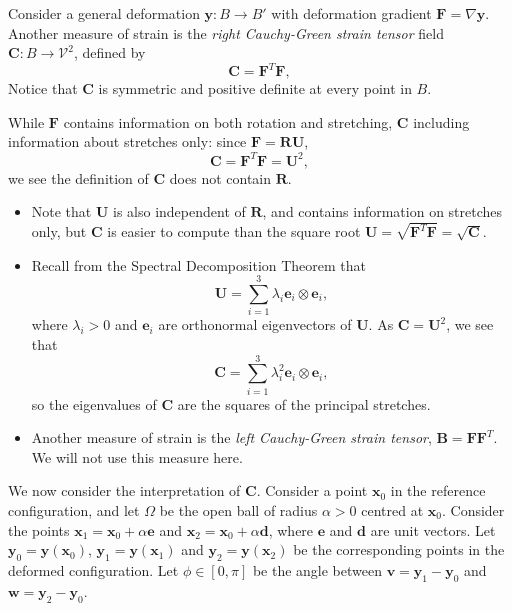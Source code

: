 \documentclass[
  letterpaper,
  DIV=11,
  numbers=noendperiod]{scrreprt}
\theoremstyle{plain}
\theoremstyle{remark}
\begin{document}
Consider a general deformation \({\boldsymbol{y}}:B\to B'\) with
deformation gradient \({\boldsymbol{F}}= \nabla {\boldsymbol{y}}\).
Another measure of strain is the \emph{right Cauchy-Green strain tensor}
field \({\boldsymbol{C}}:B\to{\mathcal{V}}^2\), defined by
\[{\boldsymbol{C}}= {\boldsymbol{F}}^T{\boldsymbol{F}},\] Notice that
\({\boldsymbol{C}}\) is symmetric and positive definite at every point
in \(B\).

While \({\boldsymbol{F}}\) contains information on both rotation and
stretching, \({\boldsymbol{C}}\) including information about stretches
only: since \({\boldsymbol{F}}={\boldsymbol{R}}{\boldsymbol{U}}\),
\[{\boldsymbol{C}}= {\boldsymbol{F}}^T{\boldsymbol{F}}= {\boldsymbol{U}}^2,\]
we see the definition of \({\boldsymbol{C}}\) does not contain
\({\boldsymbol{R}}\).

\begin{itemize}
\item
  Note that \({\boldsymbol{U}}\) is also independent of
  \({\boldsymbol{R}}\), and contains information on stretches only, but
  \({\boldsymbol{C}}\) is easier to compute than the square root
  \({\boldsymbol{U}}=\sqrt{{\boldsymbol{F}}^T{\boldsymbol{F}}}=\sqrt{{\boldsymbol{C}}}\).
\item
  Recall from the Spectral Decomposition Theorem that
  \[{\boldsymbol{U}}= \sum_{i=1}^3 \lambda_i{\boldsymbol{e}}_i\otimes{\boldsymbol{e}}_i,\]
  where \(\lambda_i>0\) and \({\boldsymbol{e}}_i\) are orthonormal
  eigenvectors of \({\boldsymbol{U}}\). As
  \({\boldsymbol{C}}= {\boldsymbol{U}}^2\), we see that
  \[{\boldsymbol{C}}= \sum_{i=1}^3 \lambda_i^2{\boldsymbol{e}}_i\otimes{\boldsymbol{e}}_i,\]
  so the eigenvalues of \({\boldsymbol{C}}\) are the squares of the
  principal stretches.
\item
  Another measure of strain is the \emph{left Cauchy-Green strain
  tensor}, \({\boldsymbol{B}}= {\boldsymbol{F}}{\boldsymbol{F}}^T\). We
  will not use this measure here.
\end{itemize}

We now consider the interpretation of \({\boldsymbol{C}}\). Consider a
point \({\boldsymbol{x}}_0\) in the reference configuration, and let
\(\Omega\) be the open ball of radius \(\alpha>0\) centred at
\({\boldsymbol{x}}_0\). Consider the points
\({\boldsymbol{x}}_1 = {\boldsymbol{x}}_0+\alpha{\boldsymbol{e}}\) and
\({\boldsymbol{x}}_2={\boldsymbol{x}}_0+\alpha{\boldsymbol{d}}\), where
\({\boldsymbol{e}}\) and \({\boldsymbol{d}}\) are unit vectors. Let
\({\boldsymbol{y}}_0={\boldsymbol{y}}({\boldsymbol{x}}_0)\),
\({\boldsymbol{y}}_1={\boldsymbol{y}}({\boldsymbol{x}}_1)\) and
\({\boldsymbol{y}}_2={\boldsymbol{y}}({\boldsymbol{x}}_2)\) be the
corresponding points in the deformed configuration. Let
\(\phi\in[0,\pi]\) be the angle between
\({\boldsymbol{v}}={\boldsymbol{y}}_1-{\boldsymbol{y}}_0\) and
\({\boldsymbol{w}}={\boldsymbol{y}}_2-{\boldsymbol{y}}_0\).
\end{document}
